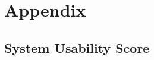 \documentclass[12pt,numbers=noenddot,parskip,bibliography=totocnumbered,listof=totocnumbered,draft]{scrreprt}
\begin{document}
\appendix
\chapter{Appendix}

\newpage
\section{System Usability Score}
\vfill
{}
\label{sus}
\vfill

\newpage
\end{document}
